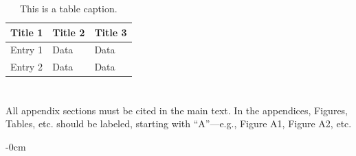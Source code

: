\documentclass[brainsci, %
               review,submit,pdftex,moreauthors%
               ]{Definitions/mdpi}
\begin{document}
\begin{table}[H] 
\caption{This is a table caption.\label{tab5}}
\begin{tabularx}{\textwidth}{CCC}
\toprule
\textbf{Title 1}	& \textbf{Title 2}	& \textbf{Title 3}\\
\midrule
Entry 1		& Data			& Data\\
Entry 2		& Data			& Data\\
\bottomrule
\end{tabularx}
\end{table}

\section[\appendixname~\thesection]{}
All appendix sections must be cited in the main text. In the appendices, Figures, Tables, etc. should be labeled, starting with ``A''---e.g., Figure A1, Figure A2, etc.


\begin{adjustwidth}{-\extralength}{0cm}


%




\end{adjustwidth}
\end{document}
